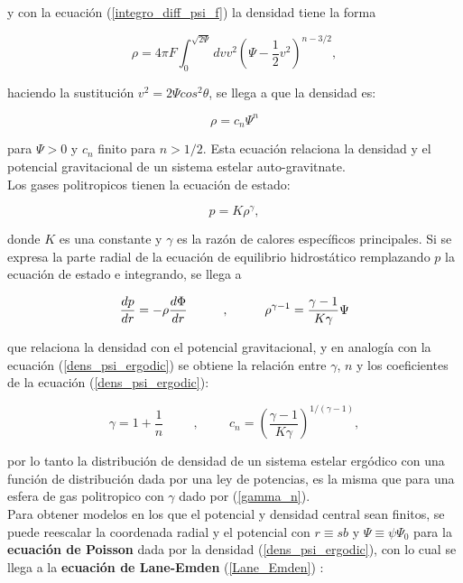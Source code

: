 y con la ecuación (\ref{integro_diff_psi_f}) la densidad tiene la forma \cite{BT08}

\begin{equation}
\rho = 4\pi F \int_0^{\sqrt{2\Psi}} dv v^2 \left( \Psi - \frac{1}{2}v^2 \right)^{n-3/2},
\end{equation}

haciendo la sustitución $v^2 = 2\Psi cos^2\theta$, se llega a que la densidad es:

\begin{equation}
\label{dens_psi_ergodic}
\rho = c_n \Psi^n
\end{equation}

para $\Psi > 0$ y $c_n$  finito para $n> 1/2$. Esta ecuación relaciona la densidad y el potencial gravitacional de un sistema estelar auto-gravitnate.\\

Los gases politropicos tienen la ecuación de estado:

$$ p = K\rho^{\gamma}, $$

donde $K$ es una constante y $\gamma$ es la razón de calores específicos principales. Si se expresa la parte radial de la ecuación de equilibrio hidrostático remplazando $p$ la ecuación de estado \cite{BT08} e integrando, se llega a

$$ \frac{d p}{dr} = -\rho \frac{d\Phi}{dr}   \hspace{1 cm},\hspace{1 cm}  \rho^{\gamma - 1} = \frac{\gamma - 1}{K \gamma} \Psi  $$

que relaciona la densidad con el potencial gravitacional, y en analogía con la ecuación (\ref{dens_psi_ergodic}) se obtiene la relación entre $\gamma$, $n$ y los coeficientes de la ecuación (\ref{dens_psi_ergodic}):

\begin{equation}
\label{gamma_n}
 \gamma = 1+\frac{1}{n} \hspace{1cm} , \hspace{1cm}   c_n = \left (  \frac{\gamma - 1}{K \gamma}  \right )^{1/(\gamma - 1)},
\end{equation}

por lo tanto la distribución de densidad de un sistema estelar ergódico con una función de distribución dada por una ley de potencias, es la misma que para una esfera de gas politropico con $\gamma$ dado por (\ref{gamma_n}).\\

Para obtener modelos en los que el potencial y densidad central sean finitos, se puede reescalar la coordenada radial y el potencial con $r \equiv sb $ y $\Psi  \equiv \psi \Psi_0 $ para la \textbf{ecuación de Poisson} dada por la densidad (\ref{dens_psi_ergodic}), con lo cual se llega a la \textbf{ecuación de Lane-Emden} (\ref{Lane_Emden}) \cite{BT08}:

